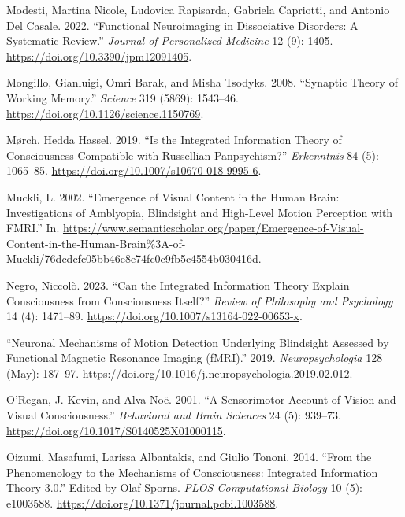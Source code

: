 \documentclass[
  a4paper]{article}
\newlength{\cslhangindent}
\newenvironment{CSLReferences}[2] %
 {\begin{list}{}{%
  \setlength{\itemindent}{0pt}
  \setlength{\leftmargin}{0pt}
  \setlength{\parsep}{0pt}
  \ifodd #1
   \setlength{\leftmargin}{\cslhangindent}
   \setlength{\itemindent}{-1\cslhangindent}
  \fi
  \setlength{\itemsep}{#2\baselineskip}}}
 {\end{list}}
\begin{document}
\begin{CSLReferences}{1}{0}
Modesti, Martina Nicole, Ludovica Rapisarda, Gabriela Capriotti, and
Antonio Del Casale. 2022. {``Functional Neuroimaging in Dissociative
Disorders: A Systematic Review.''} \emph{Journal of Personalized
Medicine} 12 (9): 1405. \url{https://doi.org/10.3390/jpm12091405}.

Mongillo, Gianluigi, Omri Barak, and Misha Tsodyks. 2008. {``Synaptic
Theory of Working Memory.''} \emph{Science} 319 (5869): 1543--46.
\url{https://doi.org/10.1126/science.1150769}.

Mørch, Hedda Hassel. 2019. {``Is the Integrated Information Theory of
Consciousness Compatible with Russellian Panpsychism?''}
\emph{Erkenntnis} 84 (5): 1065--85.
\url{https://doi.org/10.1007/s10670-018-9995-6}.

Muckli, L. 2002. {``Emergence of Visual Content in the Human Brain:
Investigations of Amblyopia, Blindsight and High-Level Motion Perception
with {FMRI}.''} In.
\url{https://www.semanticscholar.org/paper/Emergence-of-Visual-Content-in-the-Human-Brain\%3A-of-Muckli/76dcdcfc05bb46e8e74fc0c9fb5c4554b030416d}.

Negro, Niccolò. 2023. {``Can the Integrated Information Theory Explain
Consciousness from Consciousness Itself?''} \emph{Review of Philosophy
and Psychology} 14 (4): 1471--89.
\url{https://doi.org/10.1007/s13164-022-00653-x}.

{``Neuronal Mechanisms of Motion Detection Underlying Blindsight
Assessed by Functional Magnetic Resonance Imaging ({fMRI}).''} 2019.
\emph{Neuropsychologia} 128 (May): 187--97.
\url{https://doi.org/10.1016/j.neuropsychologia.2019.02.012}.

O'Regan, J. Kevin, and Alva Noë. 2001. {``A Sensorimotor Account of
Vision and Visual Consciousness.''} \emph{Behavioral and Brain Sciences}
24 (5): 939--73. \url{https://doi.org/10.1017/S0140525X01000115}.

Oizumi, Masafumi, Larissa Albantakis, and Giulio Tononi. 2014. {``From
the Phenomenology to the Mechanisms of Consciousness: Integrated
Information Theory 3.0.''} Edited by Olaf Sporns. \emph{PLOS
Computational Biology} 10 (5): e1003588.
\url{https://doi.org/10.1371/journal.pcbi.1003588}.


\end{CSLReferences}
\end{document}
